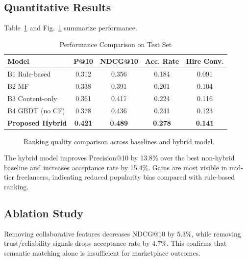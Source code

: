 \documentclass[conference]{IEEEtran}
\begin{document}
\subsection{Quantitative Results}
Table~\ref{tab:metrics} and Fig.~\ref{fig:bar} summarize performance.

\begin{table}[!t]
\caption{Performance Comparison on Test Set}
\label{tab:metrics}
\centering
\begin{tabular}{lcccc}
\toprule
Model & P@10 & NDCG@10 & Acc. Rate & Hire Conv. \\
\midrule
B1 Rule-based & 0.312 & 0.356 & 0.184 & 0.091 \\
B2 MF & 0.338 & 0.391 & 0.201 & 0.104 \\
B3 Content-only & 0.361 & 0.417 & 0.224 & 0.116 \\
B4 GBDT (no CF) & 0.378 & 0.436 & 0.241 & 0.123 \\
\textbf{Proposed Hybrid} & \textbf{0.421} & \textbf{0.489} & \textbf{0.278} & \textbf{0.141} \\
\bottomrule
\end{tabular}
\end{table}

\begin{figure}[!t]
\centering
{}
\caption{Ranking quality comparison across baselines and hybrid model.}
\label{fig:bar}
\end{figure}

The hybrid model improves Precision@10 by 13.8\% over the best non-hybrid baseline and increases acceptance rate by 15.4\%. Gains are most visible in mid-tier freelancers, indicating reduced popularity bias compared with rule-based ranking.

\subsection{Ablation Study}
Removing collaborative features decreases NDCG@10 by 5.3\%, while removing trust/reliability signals drops acceptance rate by 4.7\%. This confirms that semantic matching alone is insufficient for marketplace outcomes.
\end{document}
